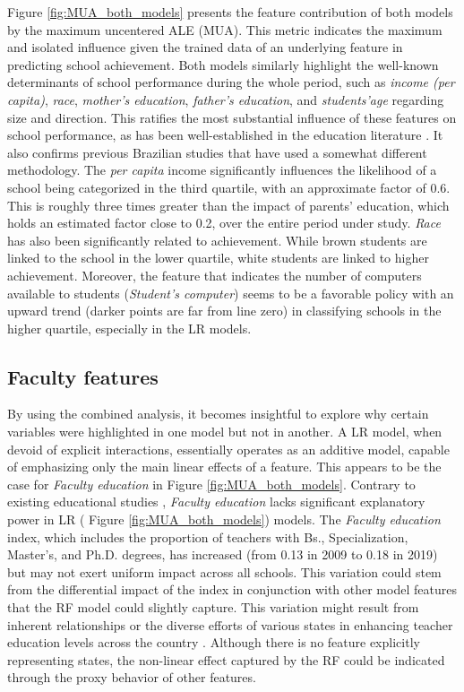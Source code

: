 Figure \ref{fig:MUA_both_models} presents the feature contribution of both models by the maximum uncentered \gls{ALE} (\gls{MUA}). This metric indicates the maximum and isolated influence given the trained data of an underlying feature in predicting school achievement. Both models similarly highlight the well-known determinants of school performance during the whole period, such as \textit{income (per capita)}, \textit{race}, \textit{mother’s education}, \textit{father’s education}, and \textit{students’age} regarding size and direction. This ratifies the most substantial influence of these features on school performance, as has been well-established in the education literature \cite{doi:10.1080/00220671.1997.10544583,   coleman1968equality, coleman2019equality}. It also confirms previous Brazilian studies \cite{Carnoy2022TrendsBrazil} that have used a somewhat different methodology. The \textit{per capita} income significantly influences the likelihood of a school being categorized in the third quartile, with an approximate factor of 0.6. This is roughly three times greater than the impact of parents' education, which holds an estimated factor close to 0.2, over the entire period under study. \textit{Race} has also been significantly related to achievement. While brown students are linked to the school in the lower quartile, white students are linked to higher achievement. Moreover, the feature that indicates the number of computers available to students (\textit{Student's computer}) seems to be a favorable policy with an upward trend (darker points are far from line zero) in classifying schools in the higher quartile, especially in the LR models.

\subsection{Faculty features}

By using the combined analysis, it becomes insightful to explore why certain variables were highlighted in one model but not in another. A LR model, when devoid of explicit interactions, essentially operates as an additive model, capable of emphasizing only the main linear effects of a feature. This appears to be the case for \textit{Faculty education} in Figure \ref{fig:MUA_both_models}. Contrary to existing educational studies \cite{doi:10.1080/00220671.1997.10544583, Darling-Hammond2000HowMatters}, \textit{Faculty education} lacks significant explanatory power in LR ( Figure \ref{fig:MUA_both_models}) models. The \textit{Faculty education} index, which includes the proportion of teachers with Bs., Specialization, Master's, and Ph.D. degrees, has increased (from 0.13 in 2009 to 0.18 in 2019) but may not exert uniform impact across all schools. This variation could stem from the differential impact of the index in conjunction with other model features that the \gls{RF} model could slightly capture. This variation might result from inherent relationships or the diverse efforts of various states in enhancing teacher education levels across the country \cite{SilvaFilho2023LeveragingEducation}. Although there is no feature explicitly representing states, the non-linear effect captured by the RF could be indicated through the proxy behavior of other features.


